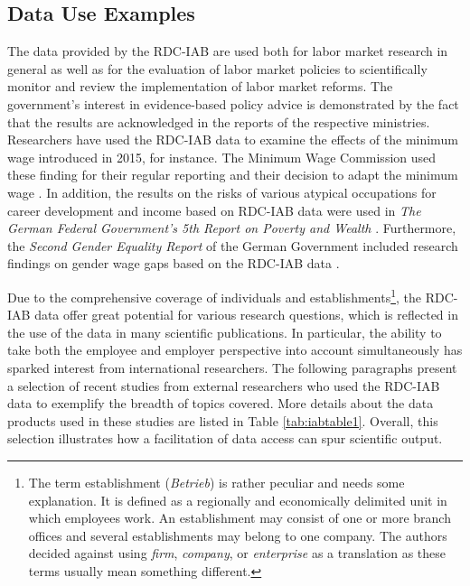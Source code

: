 \hypertarget{data-use-examples}{%
\subsection{Data Use Examples}\label{data-use-examples}}

The data provided by the RDC-IAB are used both for labor market research in general as well as for the evaluation of labor market policies to scientifically monitor and review the implementation of labor market reforms. The government's interest in evidence-based policy advice is demonstrated by the fact that the results are acknowledged in the reports of the respective ministries. Researchers have used the RDC-IAB data to examine the effects of the minimum wage introduced in 2015, for instance. The Minimum Wage Commission used these finding for their regular reporting and their decision to adapt the minimum wage \citep{mindestlohnkommission2016, mindestlohnkommission2016a}. In addition, the results on the risks of various atypical occupations for career development and income based on RDC-IAB data were used in \emph{The German Federal Government's 5th Report on Poverty and Wealth} \citep{bundesministeriumfurarbeitundsoziales2017, rheinisch-westfalischesinstitutfurwirtschaftsforschung2016}. Furthermore, the \emph{Second Gender Equality Report} of the German Government included research findings on gender wage gaps based on the RDC-IAB data \citep{bmfsfjbundesministeriumfurfamilieseniorenfrauenundjugend2017, boll2015}.

Due to the comprehensive coverage of individuals and establishments\footnote{The term establishment (\emph{Betrieb}) is rather peculiar and needs some explanation. It is defined as a regionally and economically delimited unit in which employees work. An establishment may consist of one or more branch offices and several establishments may belong to one company. The authors decided against using \emph{firm}, \emph{company}, or \emph{enterprise} as a translation as these terms usually mean something different.}, the RDC-IAB data offer great potential for various research questions, which is reflected in the use of the data in many scientific publications. In particular, the ability to take both the employee and employer perspective into account simultaneously has sparked interest from international researchers. The following paragraphs present a selection of recent studies from external researchers who used the RDC-IAB data to exemplify the breadth of topics covered. More details about the data products used in these studies are listed in Table \ref{tab:iabtable1}. Overall, this selection illustrates how a facilitation of data access can spur scientific output.

